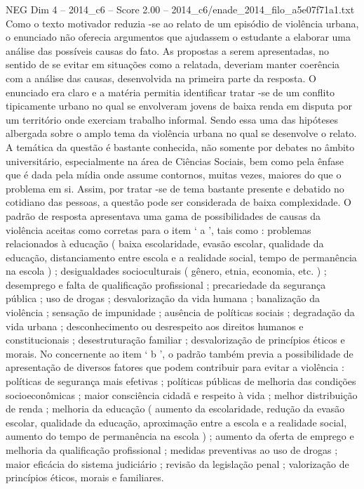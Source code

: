 \begin{textsample}{NEG Dim 4 – 2014\_c6 – Score 2.00 – 2014\_c6/enade\_2014\_filo\_a5e07f71a1.txt}
Como o texto motivador reduzia -se ao relato de um episódio de violência urbana, o enunciado não oferecia argumentos que ajudassem o estudante a elaborar uma análise das possíveis causas do fato.
As propostas a serem apresentadas, no sentido de se evitar em situações como a relatada, deveriam manter coerência com a análise das causas, desenvolvida na primeira parte da resposta.
O enunciado era claro e a matéria permitia identificar tratar -se de um conflito tipicamente urbano no qual se envolveram jovens de baixa renda em disputa por um território onde exerciam trabalho informal.
Sendo essa uma das hipóteses albergada sobre o amplo tema da violência urbana no qual se desenvolve o relato.
A temática da questão é bastante conhecida, não somente por debates no âmbito universitário, especialmente na área de Ciências Sociais, bem como pela ênfase que é dada pela mídia onde assume contornos, muitas vezes, maiores do que o problema em si.
Assim, por tratar -se de tema bastante presente e debatido no cotidiano das pessoas, a questão pode ser considerada de baixa complexidade.
O padrão de resposta apresentava uma gama de possibilidades de causas da violência aceitas como corretas para o item ‘ a ’, tais como : problemas relacionados à educação ( baixa escolaridade, evasão escolar, qualidade da educação, distanciamento entre escola e a realidade social, tempo de permanência na escola ) ; desigualdades socioculturais ( gênero, etnia, economia, etc. ) ; desemprego e falta de qualificação profissional ; precariedade da segurança pública ; uso de drogas ; desvalorização da vida humana ; banalização da violência ; sensação de impunidade ; ausência de políticas sociais ; degradação da vida urbana ; desconhecimento ou desrespeito aos direitos humanos e constitucionais ; desestruturação familiar ; desvalorização de princípios éticos e morais.
No concernente ao item ‘ b ’, o padrão também previa a possibilidade de apresentação de diversos fatores que podem contribuir para evitar a violência : políticas de segurança mais efetivas ; políticas públicas de melhoria das condições socioeconômicas ; maior consciência cidadã e respeito à vida ; melhor distribuição de renda ; melhoria da educação ( aumento da escolaridade, redução da evasão escolar, qualidade da educação, aproximação entre a escola e a realidade social, aumento do tempo de permanência na escola ) ; aumento da oferta de emprego e melhoria da qualificação profissional ; medidas preventivas ao uso de drogas ; maior eficácia do sistema judiciário ; revisão da legislação penal ; valorização de princípios éticos, morais e familiares.

\end{textsample}

